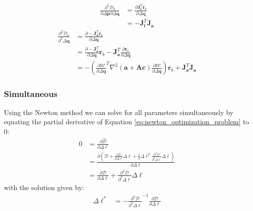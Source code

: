 \begin{equation}
    \begin{aligned}
		\frac{\partial^2 \mathcal{D}_b}{\partial \Delta \mathbf{p} \partial \Delta \mathbf{q}} & =  \frac{\partial \mathbf{J}_{\mathbf{i}}^T \mathbf{r}_b}{\partial \Delta \mathbf{q}}
		\\
		& = -\mathbf{J}_{\mathbf{i}}^T \mathbf{J}_{\mathbf{a}}
    \label{eq:bidirectional_hessian_term5}
    \end{aligned}
\end{equation}
\begin{equation}
    \begin{aligned}
		\frac{\partial^2 \mathcal{D}_b}{\partial^2 \Delta \mathbf{q}} & =  \frac{\partial -\mathbf{J}_{\mathbf{a}}^T \mathbf{r}_b}{\partial \Delta \mathbf{q}}
		\\
		& = \frac{\partial -\mathbf{J}_{\mathbf{a}}^T}{\partial \Delta \mathbf{q}} \mathbf{r}_b - \mathbf{J}_{\mathbf{a}}^T \frac{\partial \mathbf{r}_b}{\partial \Delta \mathbf{q}}
		\\
		& = -\left( \frac{\partial\mathcal{W}}{\partial \Delta \mathbf{q}}^T \nabla^2 (\mathbf{a} + \mathbf{A}\mathbf{c}) \frac{\partial\mathcal{W}}{\partial \Delta \mathbf{q}} \right) \mathbf{r}_b + \mathbf{J}_{\mathbf{a}}^T \mathbf{J}_{\mathbf{a}}
    \label{q:bidirectional_hessian_term6}
    \end{aligned}
\end{equation}


\subsubsection*{Simultaneous}
\label{sec:newton_simultaneous}

Using the Newton method we can solve for all parameters simultaneously by equating the partial derivative of Equation \ref{eq:newton_optimization_problem} to $0$:
\begin{equation}
    \begin{aligned}
    	0 & = \frac{\partial\hat{\mathcal{D}}}{\partial \Delta \boldsymbol{\ell}}
    	\\
    	& = \frac{\partial \left(\mathcal{D} + \frac{\partial \mathcal{D}}{\partial \Delta \boldsymbol{\ell}} \Delta \boldsymbol{\ell} + \frac{1}{2} \Delta \boldsymbol{\ell}^T \frac{\partial^2 \mathcal{D}}{\partial^2 \Delta \boldsymbol{\ell}} \Delta \boldsymbol{\ell} \right)}{\partial \Delta \boldsymbol{\ell}}
    	\\
		& = \frac{\partial \mathcal{D}}{\partial \Delta \boldsymbol{\ell}} + \frac{\partial^2 \mathcal{D}}{\partial^2 \Delta \boldsymbol{\ell}} \Delta \boldsymbol{\ell}
    \label{eq:ssd_bc}
    \end{aligned}
\end{equation}
with the solution given by:
\begin{equation}
    \begin{aligned}
    	\Delta \boldsymbol{\ell}^* & = -\frac{\partial^2 \mathcal{D}}{\partial^2 \Delta \boldsymbol{\ell}}^{-1} \frac{\partial \mathcal{D}}{\partial \Delta \boldsymbol{\ell}}
    \label{eq:ssd_bc}
    \end{aligned}
\end{equation}

